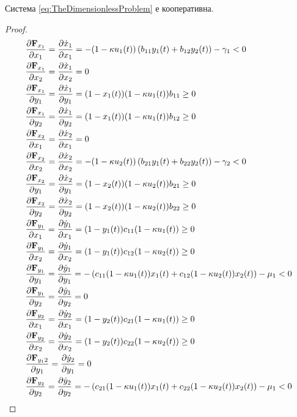     \begin{proposition}
    Система \ref{eq:TheDimensionlessProblem} е кооперативна.
    \end{proposition}

    \begin{proof}
    \begin{equation}
      \label{eq:JacobianElements}
    \begin{split}
      &\pdv{\mathbf{F}_{x_1}}{x_1} = \pdv{\dot{x}_1}{x_1} = -(1-\kappa u_1(t)) \left(b_{11} y_1(t) + b_{12} y_2(t)\right) - \gamma_1 < 0 \\
      &\pdv{\mathbf{F}_{x_1}}{x_2} = \pdv{\dot{x}_1}{x_2} = 0 \\
      &\pdv{\mathbf{F}_{x_1}}{y_1} = \pdv{\dot{x}_1}{y_1} = (1-x_1(t)) (1-\kappa u_1(t)) b_{11} \geq 0 \\
      &\pdv{\mathbf{F}_{x_1}}{y_2} = \pdv{\dot{x}_1}{y_2} = (1-x_1(t)) (1-\kappa u_1(t)) b_{12} \geq 0 \\
      &\pdv{\mathbf{F}_{x_2}}{x_1} = \pdv{\dot{x}_2}{x_1} = 0 \\
      &\pdv{\mathbf{F}_{x_2}}{x_2} = \pdv{\dot{x}_2}{x_2} = -(1-\kappa u_2(t)) \left(b_{21} y_1(t) + b_{22} y_2(t)\right) - \gamma_2 < 0 \\
      &\pdv{\mathbf{F}_{x_2}}{y_1} = \pdv{\dot{x}_2}{y_1} = (1-x_2(t)) (1-\kappa u_2(t)) b_{21} \geq 0 \\
      &\pdv{\mathbf{F}_{x_2}}{y_2} = \pdv{\dot{x}_2}{y_2} = (1-x_2(t)) (1-\kappa u_2(t)) b_{22} \geq 0 \\
      &\pdv{\mathbf{F}_{y_1}}{x_1} = \pdv{\dot{y}_1}{x_1} = (1-y_1(t)) c_{11}(1-\kappa u_1(t)) \geq 0 \\
      &\pdv{\mathbf{F}_{y_1}}{x_2} = \pdv{\dot{y}_1}{x_2} = (1-y_1(t)) c_{12}(1-\kappa u_2(t)) \geq 0 \\
      &\pdv{\mathbf{F}_{y_1}}{y_1} = \pdv{\dot{y}_1}{y_1} = -\left(c_{11}(1-\kappa u_1(t)) x_1(t) + c_{12}(1-\kappa u_2(t)) x_2(t)\right) - \mu_1 < 0 \\
      &\pdv{\mathbf{F}_{y_1}}{y_2} = \pdv{\dot{y}_1}{y_2} = 0 \\
      &\pdv{\mathbf{F}_{y_2}}{x_1} = \pdv{\dot{y}_2}{x_1} = (1-y_2(t)) c_{21}(1-\kappa u_1(t)) \geq 0 \\
      &\pdv{\mathbf{F}_{y_2}}{x_2} = \pdv{\dot{y}_2}{x_2} = (1-y_2(t)) c_{22}(1-\kappa u_2(t)) \geq 0 \\
      &\pdv{\mathbf{F}_{y_12}}{y_1} = \pdv{\dot{y}_2}{y_1} = 0 \\
      &\pdv{\mathbf{F}_{y_2}}{y_2} = \pdv{\dot{y}_2}{y_2} = -\left(c_{21}(1-\kappa u_1(t)) x_1(t) + c_{22}(1-\kappa u_2(t)) x_2(t)\right) - \mu_1 < 0
      \end{split}
      \end{equation}
      \end{proof}

